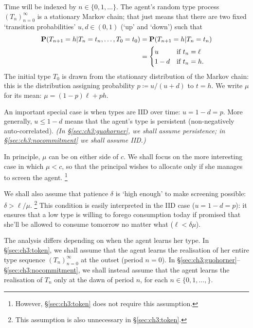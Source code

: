 Time will be indexed by $n \in \{0,1,\dots\}$.
The agent's random type process $( T_n )_{n=0}^\infty$ is a stationary Markov chain;
that just means that there are two fixed `transition probabilities' $u,d \in (0,1)$ (`up' and `down') such that
%
\begin{align*}
	\PP\left( T_{n+1} = h \middle|
	T_n = t_n, \dots,
	T_0 = t_0 \right)
	&= \PP\left( T_{n+1} = h \middle|
	T_n = t_n \right)
	\\
	&=
	\begin{cases}
		u		& \text{if $t_n = \ell$} \\
		1-d		& \text{if $t_n = h$.} 
	\end{cases}
\end{align*}
%
The initial type $T_0$ is drawn from the stationary distribution of the Markov chain: this is the distribution assigning probability $p \coloneqq u / (u+d)$ to $t=h$.
We write $\mu$ for its mean: $\mu = (1-p) \ell + p h$.

An important special case is when types are IID over time: $u=1-d=p$.
More generally, $u \leq 1-d$ means that the agent's type is persistent (non-negatively auto-correlated).
\emph{(In §\ref{sec:ch3:guohorner}, we shall assume persistence; in §\ref{sec:ch3:nocommitment} we shall assume IID.)}

In principle, $\mu$ can be on either side of $c$.
We shall focus on the more interesting case in which $\mu < c$, so that the principal wishes to allocate only if she manages to screen the agent.%
	\footnote{However, §\ref{sec:ch3:token} does not require this assumption.}

We shall also assume that patience $\delta$ is `high enough' to make screening possible: $\delta > \ell/\mu$.%
	\footnote{This assumption is also unnecessary in §\ref{sec:ch3:token}.}
This condition is easily interpreted in the IID case ($u=1-d=p$):
it ensures that a low type is willing to forego consumption today if promised that she'll be allowed to consume tomorrow no matter what ($\ell < \delta \mu$).

The analysis differs depending on when the agent learns her type.
In §\ref{sec:ch3:token}, we shall assume that the agent learns the realisation of her entire type sequence $(T_n)_{n=0}^\infty$ at the outset (period $n=0$).
In §\ref{sec:ch3:guohorner}--§\ref{sec:ch3:nocommitment}, we shall instead assume that the agent learns the realisation of $T_n$ only at the dawn of period $n$, for each $n \in \{0,1,\dots,\}$.



